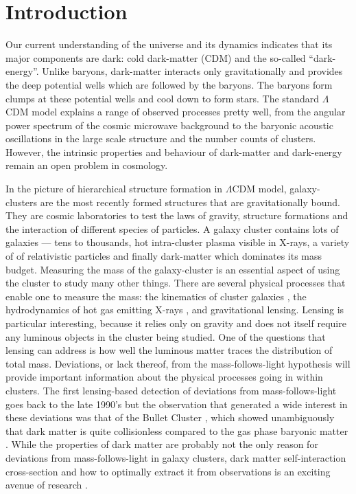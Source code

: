 \documentclass[
  11pt,
  twoside,
  openright,
  titlepage,
  headings=optiontoheadandtoc
]{scrbook}
\begin{document}

\section{Introduction}

Our current understanding of the universe and its dynamics indicates
that its major components are dark: cold dark-matter (CDM) and the
so-called ``dark-energy''.  Unlike baryons, dark-matter
interacts only gravitationally and provides the deep potential wells
which are followed by the baryons. The baryons form clumps at these
potential wells and cool down to form stars.  The standard
$\Lambda$CDM model explains a range of observed processes pretty well,
from the angular power spectrum of the cosmic microwave background \citep{2013arXiv1303.5075P} to
the baryonic acoustic oscillations \citep{2013MNRAS.433.1202S} in the large scale structure and
the number counts of clusters.  However, the intrinsic properties and
behaviour of dark-matter and dark-energy remain an open problem in
cosmology.

In the picture of hierarchical structure formation in $\Lambda$CDM
model, galaxy-clusters are the most recently formed structures that
are gravitationally bound. They are cosmic laboratories to test
the laws of gravity, structure formations and the interaction of
different species of particles. A galaxy cluster contains lots of
galaxies --- tens to thousands, hot intra-cluster plasma visible in
X-rays, a variety of of relativistic particles and finally dark-matter
which dominates its mass budget.  Measuring the mass of the galaxy-cluster 
is an essential aspect of using the cluster to study many other things.
There are several physical processes that enable one to measure
the mass: the kinematics of cluster galaxies
\citep{2013ApJ...772...47S}, the hydrodynamics of hot gas emitting
X-rays \citep{2009ApJ...692.1033V}, and gravitational lensing.  Lensing
is particular interesting, because it relies only on gravity and does
not itself require any luminous objects in the cluster being studied.
One of the questions that lensing can address is how well the luminous matter
traces the distribution of total mass. Deviations, or lack thereof, from the
mass-follows-light hypothesis will provide important information about the 
physical processes going in within clusters. The first lensing-based detection 
of deviations from mass-follows-light goes back to the late 1990's 
\citep{1998AJ....116.1541A} but the observation that generated a wide interest 
in these deviations was that of the Bullet Cluster \citep{2006ApJ...648L.109C}, 
which showed unambiguously that dark matter is quite collisionless compared to 
the gas phase baryonic matter \citep{2008ApJ...679.1173R}. While the properties 
of dark matter are probably not the only reason for deviations from mass-follows-light
in galaxy clusters, dark matter self-interaction cross-section and how to optimally
extract it from observations is an exciting avenue of research 
\citep{2013arXiv1310.1731H,2013MNRAS.433.1517H}.
\end{document}
